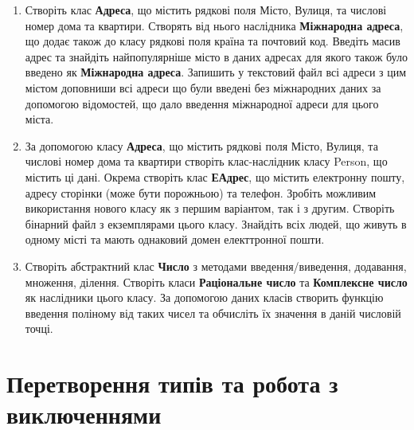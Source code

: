 \documentclass[a5paper,titlepage,openany,twoside,draft]{book_unv}%
\begin{document}
\begin{enumerate}
\item
Створіть клас \textbf{Адреса}, що містить рядкові поля Місто, Вулиця, та числові номер дома та квартири. 
Створять від нього наслідника \textbf{Міжнародна адреса}, що додає також до класу рядкові поля країна та почтовий код.
Введіть масив адрес та знайдіть найпопулярніше місто в даних адресах для якого також було введено як \textbf{Міжнародна адреса}. 
Запишить у текстовий файл всі адреси з цим містом доповниши всі адреси що були введені без міжнародних даних
за допомогою відомостей, що дало введення міжнародної адреси для цього міста.

\item
За допомогою класу \textbf{Адреса}, що містить рядкові поля Місто, Вулиця, та числові номер дома та квартири
створіть клас-наслідник класу Person, що містить ці дані. Окрема створіть клас \textbf{ЕАдрес}, що містить
електронну пошту, адресу сторінки (може бути порожньою) та телефон. 
Зробіть можливим використання нового класу як з першим варіантом,
так і з другим. Створіть бінарний файл з екземплярами цього класу. Знайдіть всіх людей, що 
живуть в одному місті та мають однаковий домен електтронної пошти. 


\item
Створіть абстрактний клас \textbf{Число} з методами введення/виведення, додавання, множення, ділення.
Створіть класи \textbf{Раціональне число} та \textbf{Комплексне число} як наслідники цього класу. 
За допомогою даних класів створить функцію введення поліному від таких чисел
та обчисліть їх значення в даній числовій точці.


\end{enumerate}


\chapter{Перетворення типів та робота з виключеннями}
%
\end{document}
